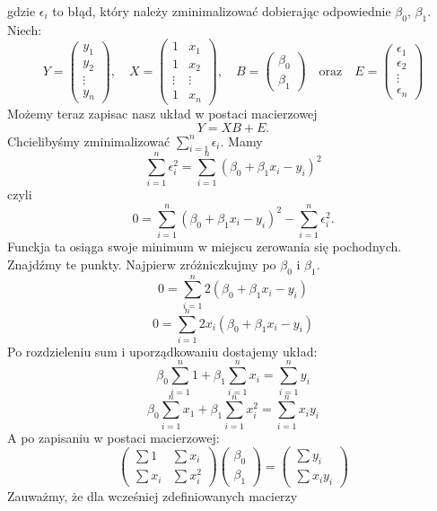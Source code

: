 \documentclass[a4paper,12pt]{article}
\begin{document}
\noindent gdzie $\epsilon_i$ to błąd, który należy zminimalizować dobierając odpowiednie $\beta_0$, $\beta_1$. \\
Niech:
$$
Y = \begin{pmatrix} y_1 \\ y_2 \\ \vdots \\ y_n \end{pmatrix}, \quad
X = \begin{pmatrix} 1 & x_1 \\ 1 & x_2 \\ \vdots & \vdots \\ 1 & x_n \end{pmatrix}, \quad
B = \begin{pmatrix} \beta_0 \\ \beta_1 \end{pmatrix} \quad
\text{oraz} \quad
E = \begin{pmatrix} \epsilon_1 \\  \epsilon_2 \\ \vdots \\  \epsilon_n \end{pmatrix}
$$
Możemy teraz zapisac nasz układ w postaci macierzowej
$$ Y = XB + E .$$
Chcielibyśmy zminimalizować $\sum_{i=1}^n\epsilon_i$.
Mamy $$ \sum_{i=1}^n\epsilon_i^2 = \sum_{i=1}^n(\beta_0 + \beta_1x_i - y_i)^2 $$
czyli $$ 0 = \sum_{i=1}^n(\beta_0 + \beta_1x_i - y_i)^2 - \sum_{i=1}^n\epsilon_i^2. $$
Funckja ta osiąga swoje minimum w miejscu zerowania się pochodnych. Znajdźmy te punkty. Najpierw zróżniczkujmy po $\beta_0 $ i $\beta_1$.
$$ 0 = \sum_{i=1}^n 2  (\beta_0 + \beta_1x_i - y_i) $$
$$ 0 = \sum_{i=1}^n 2  x_i (\beta_0 + \beta_1x_i - y_i) $$
Po rozdzieleniu sum i uporządkowaniu dostajemy układ:
$$ \beta_0 \sum_{i=1}^n 1 + \beta_1 \sum_{i=1}^n x_i = \sum_{i=1}^n y_i $$
$$ \beta_0 \sum_{i=1}^n x_1 + \beta_1 \sum_{i=1}^n x_i^2 = \sum_{i=1}^n x_iy_i $$
A po zapisaniu w postaci macierzowej:
$$
\begin{pmatrix} \sum 1 & \sum x_i \\
\sum x_i & \sum x_i^2 \end{pmatrix} 
\begin{pmatrix} \beta_0 \\ \beta_1 \end{pmatrix}
=
\begin{pmatrix} \sum y_i \\ \sum x_iy_i \end{pmatrix} 
$$
Zauważmy, że dla wcześniej zdefiniowanych macierzy
\end{document}
